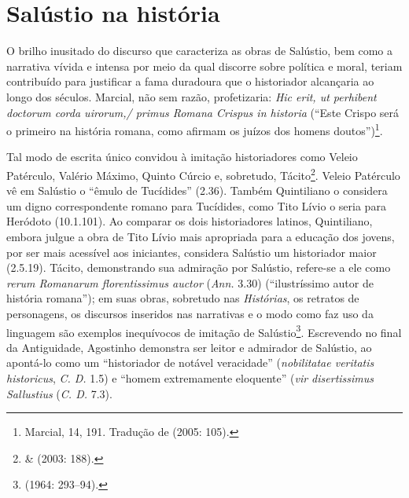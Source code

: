\newcommand{\lat}{}%
\newcommand{\old}{\textsc{old}}
\newcommand{\lp}{\textsc{lp}}


\newcommand{\bra}{\selectlanguage{brazilian}{}} 
\newcommand{\ot}{\emph{Orator}\ }



\section{Salústio na história} 

O brilho inusitado do discurso que caracteriza
as obras de Salústio, bem como a narrativa vívida e intensa por meio da qual
discorre sobre política e moral, teriam contribuído para justificar a fama
duradoura que o historiador alcançaria ao longo dos séculos. Marcial, não sem
razão, profetizaria: \emph{Hic erit, ut perhibent doctorum corda uirorum,/
primus Romana Crispus in historia}  (“Este Crispo será o primeiro na história
romana, como afirmam os juízos dos homens doutos”)\footnote{Marcial, 14, 191.
Tradução de  (2005: 105).}. 

Tal modo de escrita único convidou à imitação historiadores como Veleio
Patérculo, Valério Máximo, Quinto Cúrcio e, sobretudo,
Tácito\footnote{ \&   (2003: 188).}. Veleio
Patérculo vê em Salústio o “êmulo de Tucídides” (2.36). Também Quintiliano o
considera um digno correspondente romano para Tucídides, como Tito Lívio o
seria para Heródoto (10.1.101).  Ao comparar os dois historiadores latinos,
Quintiliano, embora julgue a obra de Tito Lívio mais apropriada para a educação
dos jovens, por ser mais acessível aos iniciantes, considera Salústio um
historiador maior (2.5.19).  Tácito, demonstrando sua admiração por Salústio,
refere-se a ele como \lat \emph{rerum Romanarum florentissimus auctor} \bra
(\emph{Ann.} 3.30) (“ilustríssimo autor de história romana”); em suas obras,
sobretudo nas \emph{Histórias},  os retratos de personagens, os discursos
inseridos nas narrativas e o modo como faz uso da linguagem são exemplos
inequívocos de imitação de Salústio\footnote{ (1964: 293--94).}.
Escrevendo no final da Antiguidade, Agostinho  demonstra ser leitor e admirador
de Salústio, ao apontá-lo como um  “historiador de notável veracidade”
(\emph{nobilitatae veritatis historicus}, \emph{C. D.} 1.5) e ``homem
extremamente eloquente'' (\emph{vir disertissimus Sallustius} (\emph{C. D.} 7.3). 

